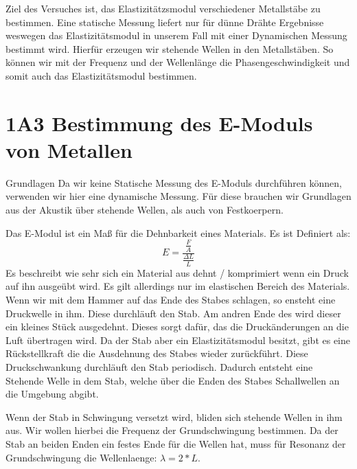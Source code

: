 \documentclass[twoside]{protokoll}
\begin{document}
\begin{versuchsziele}
Ziel des Versuches ist, das Elastizitätzsmodul verschiedener Metallstäbe zu bestimmen.
Eine statische Messung liefert nur für dünne Drähte Ergebnisse weswegen das Elastizitätsmodul in unserem Fall mit einer Dynamischen Messung bestimmt wird. Hierfür erzeugen wir stehende Wellen in den Metallstäben. So können wir mit der Frequenz und der Wellenlänge die Phasengeschwindigkeit und somit auch das Elastizitätsmodul bestimmen. 
\end{versuchsziele}

 
\section{1A3 Bestimmung des E-Moduls von Metallen}

\begin{aufgabe}{Grundlagen}
    Da wir keine Statische Messung des E-Moduls durchführen können, verwenden wir hier eine dynamische Messung.
    Für diese brauchen wir Grundlagen aus der Akustik über stehende Wellen, als auch von Festkoerpern.


    Das E-Modul ist ein Maß für die Dehnbarkeit eines Materials. Es ist Definiert als: 
    \begin{equation}
        E = \frac{\frac{F}{A}}{\frac{\Delta L}{L}}
    \end{equation}
    Es beschreibt wie sehr sich ein Material aus dehnt / komprimiert wenn ein Druck auf ihn ausgeübt wird.
    Es gilt allerdings nur im elastischen Bereich des Materials.\\
    
    Wenn wir mit dem Hammer auf das Ende des Stabes schlagen, so ensteht eine Druckwelle in ihm.
    Diese durchläuft den Stab. Am andren Ende des wird dieser ein kleines Stück ausgedehnt.
    Dieses sorgt dafür, das die Druckänderungen an die Luft übertragen wird.
    Da der Stab aber ein Elastizitätsmodul besitzt, gibt es eine Rückstellkraft die die Ausdehnung des Stabes wieder zurückführt.
    Diese Druckschwankung durchläuft den Stab periodisch.
    Dadurch entsteht eine Stehende Welle in dem Stab, welche über die Enden des Stabes Schallwellen an die Umgebung abgibt.

    Wenn der Stab in Schwingung versetzt wird, bliden sich stehende Wellen in ihm aus.
    Wir wollen hierbei die Frequenz der Grundschwingung bestimmen.
    Da der Stab an beiden Enden ein festes Ende für die Wellen hat, muss für Resonanz der Grundschwingung die Wellenlaenge: $\lambda = 2 * L$. 
     

\end{aufgabe}
\end{document}
